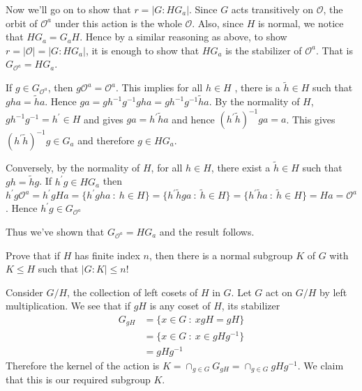 \documentclass[12pt]{exam}
\theoremstyle{plain} %
\theoremstyle{definition} %
\theoremstyle{remark} %
\begin{document}
\begin{questions}
\begin{solution}
\begin{parts}
      Now we'll go on to show that $r = |G:HG_a|$. Since $G$ acts
      transitively on $\mathcal{O}$, the orbit of
      $\mathcal{O}^a$ under this action is the whole $\mathcal{O}$.
      Also, since $H$ is normal, we notice that $HG_a = G_aH$.
      Hence by a similar reasoning as above, to show $ r = |\mathcal{O}| = |G :
      HG_a|$, it is enough to show that $HG_a$ is the stabilizer of
      $\mathcal{O}^a$. That is $G_{\mathcal{O}^a} = HG_a$.

      If $g \in G_{\mathcal{O}^a}$, then $g \mathcal{O}^a =
      \mathcal{O}^a$. This implies for all $h \in H$ , there is a
      $\tilde{h} \in H$ such that $gha = \tilde{h}a$. Hence
      $ga = gh^{-1}g^{-1}gha = gh^{-1}g^{-1} \tilde{h}a$. By the
      normality of $H$, $ gh^{-1}g^{-1} = h^\prime \in H$ and gives
      $ga = h^\prime \tilde{h}a$ and hence $(h^\prime \tilde{h})^{-1}
      g a = a$. This gives $(h^\prime \tilde{h})^{-1}g \in G_a$ and
      therefore $g \in HG_a$.

      Conversely, by the normality of $H$, for all $h \in H$, there
      exist a $\tilde{h} \in H$ such that $gh = \tilde{h}g$. If
      $h^\prime g \in HG_a$ then $h^\prime g \mathcal{O}^a = h^\prime
      gHa = \{ h^\prime gha  \ : \ h \in H  \} = \{ h^\prime
      \tilde{h}ga  \ : \ \tilde{h} \in H  \} = \{ h^\prime
      \tilde{h}a  \ : \  \tilde{h} \in H \} = Ha = \mathcal{O}^a$.
      Hence $h^\prime g \in G_{\mathcal{O}^a}$

      Thus we've shown that $G_{\mathcal{O}^{a}} = HG_a$ and the result follows.

    \end{parts}

  \end{solution}

  \question
  Prove that if $H$ has finite index $n$, then there is a normal
  subgroup $K$ of $G$ with $K \leqslant H$ such that $|G:K| \le n!$
  \label{q:2}
  \begin{solution}
    Consider $G/H$, the collection of left cosets of $H$ in $G$. Let
    $G$ act on $G/H$ by left multiplication. We see that if $gH$ is
    any coset of $H$, its stabilizer
    \begin{align*}
      G_{gH} & = \{ x \in G  \ : \  xgH = gH \} \\
      &= \{ x \in G  \ : \  x \in gHg^{-1} \} \\
      &= gHg^{-1}
    \end{align*}
    Therefore the kernel of the action is $K = \cap_{g \in G}G_{gH} =
    \cap_{ g \in G}gHg^{-1}$. We claim that this is our required subgroup $K$.


\end{solution}
\end{questions}
\end{document}
